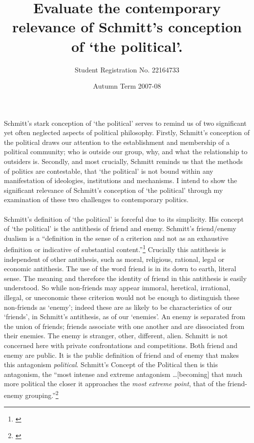 \documentclass[12pt,a4paper,titlepage]{article}
\title{Evaluate the contemporary relevance of Schmitt's conception of `the political'.}
\author{Student Registration No. 22164733}
\date{Autumn Term 2007-08}
\begin{document}

\maketitle
\doublespacing
\paragraph{}Schmitt's stark conception of `the political' serves to remind us of two significant yet often neglected aspects of political philosophy. Firstly, Schmitt's conception of the political draws our attention to the establishment and membership of a political community; who is outside our group, why, and what the relationship to outsiders is. Secondly, and most crucially, Schmitt reminds us that the methods of politics are contestable, that `the political' is not bound within any manifestation of ideologies, institutions and mechanisms. I intend to show the significant relevance of Schmitt's conception of `the political' through my examination of these two challenges to contemporary politics.

\paragraph{}Schmitt's definition of `the political' is forceful due to its simplicity. His concept of `the political' is the antithesis of friend and enemy. Schmitt's friend/enemy dualism is a ``definition in the sense of a criterion and not as an exhaustive definition or indicative of substantial content.''\footnote{\cite[p.26]{schmitt:2007cop}} Crucially this antithesis is independent of other antithesis, such as moral, religious, rational, legal or economic antithesis. The use of the word friend is in its down to earth, literal sense. The meaning and therefore the identity of friend in this antithesis is easily understood. So while non-friends may appear immoral, heretical, irrational, illegal, or uneconomic these criterion would not be enough to distinguish these non-friends as `enemy'; indeed these are as likely to be characteristics of our `friends', in Schmitt's antithesis, as of our `enemies'. An enemy is separated from the union of friends; friends associate with one another and are dissociated from their enemies. The enemy is stranger, other, different, alien. Schmitt is not concerned here with private confrontations and competitions. Both friend and enemy are public. It is the public definition of friend and of enemy that makes this antagonism \emph{political}. Schmitt's Concept of the Political then is this antagonism, the ``most intense and extreme antagonism \ldots [becoming] that much more political the closer it approaches the \emph{most extreme point}, that of the friend-enemy grouping.''\footnote{\cite[p.29, emphasis added]{schmitt:2007cop}}
\end{document}
